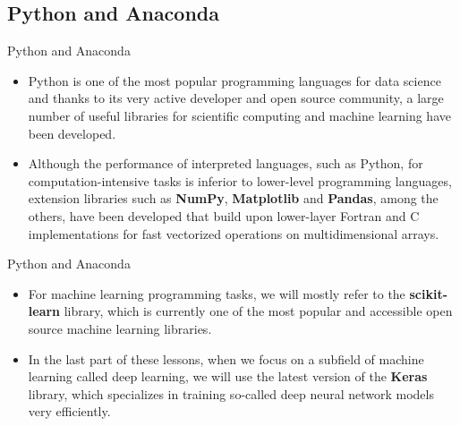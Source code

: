 \documentclass[11pt]{beamer}
\begin{document}
\subsection{Python and Anaconda}
%
\begin{frame}{Python and Anaconda}
	\begin{itemize}
		\item Python is one of the most popular programming languages for data science and thanks to its very active developer and open source community, a large number of
useful libraries for scientific computing and machine learning have been developed.
\item Although the performance of interpreted languages, such as Python, for
computation-intensive tasks is inferior to lower-level programming languages,
extension libraries such as \textbf{NumPy}, \textbf{Matplotlib} and \textbf{Pandas}, among the others, have been developed that build
upon lower-layer Fortran and C implementations for fast vectorized operations
on multidimensional arrays.
	\end{itemize}
\end{frame}
\begin{frame}{Python and Anaconda}
	\begin{itemize}
		\item For machine learning programming tasks, we will mostly refer to the \textbf{scikit-learn}
library, which is currently one of the most popular and accessible open source
machine learning libraries. 
\item In the last part of these lessons, when we focus on a subfield
of machine learning called deep learning, we will use the latest version of the
\textbf{Keras} library, which specializes in training so-called deep neural network
models very efficiently.  
 
	\end{itemize}
\end{frame}
\end{document}
